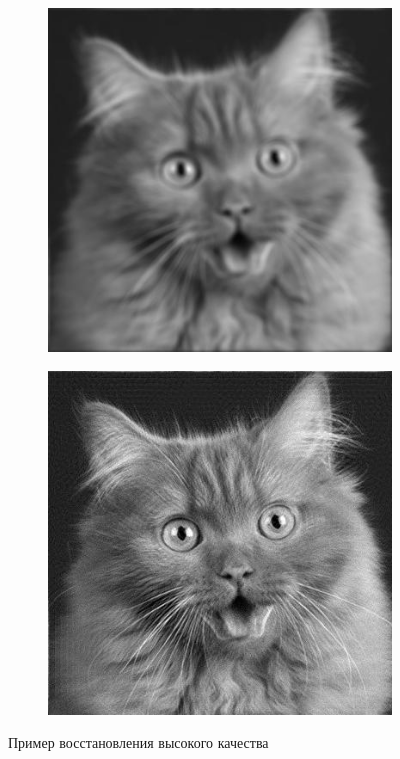 \begin{figure}[!h]
	\centering
	\begin{subfigure}{.5\textwidth}
		\centering
		\includegraphics[scale=0.45]{assets/cat_perfect}
	\end{subfigure}%
	\begin{subfigure}{.5\textwidth}
		\centering
		\includegraphics[scale=0.46]{assets/cat_perfect_result}
	\end{subfigure}
	\caption{Пример восстановления высокого качества}
	\label{expr8}
\end{figure}

\clearpage

